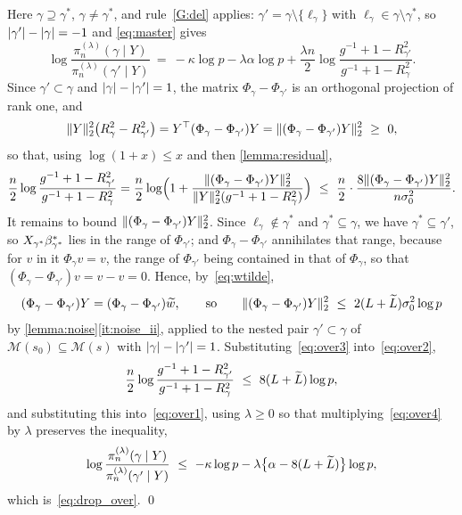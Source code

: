 Here $\gamma\supseteq\gamma^{\ast}$, $\gamma\neq\gamma^{\ast}$, and
rule~\ref{G:del} applies: $\gamma'=\gamma\setminus\{\ell_\gamma\}$ with
$\ell_\gamma\in\gamma\setminus\gamma^\ast$, so
$\lvert\gamma'\rvert-\lvert\gamma\rvert=-1$ and \eqref{eq:master} gives
\begin{equation}
    \label{eq:over1}
    \log\frac{\pi_n^{(\lambda)}(\gamma\mid Y)}
    {\pi_n^{(\lambda)}(\gamma'\mid Y)}
    \ =\ -\kappa\log p-\lambda\alpha\log p
    +\frac{\lambda n}{2}
    \log\frac{g^{-1}+1-R^{2}_{\gamma'}}{g^{-1}+1-R^{2}_{\gamma}} .
\end{equation}
Since $\gamma'\subset\gamma$ and $\lvert\gamma\rvert-\lvert\gamma'\rvert=1$, the matrix
$\Phi_\gamma-\Phi_{\gamma'}$ is an orthogonal projection of rank one, and
\begin{equation}
    \label{eq:over1b}
    \lVert Y\rVert_2^{2}\bigl(R^{2}_{\gamma}-R^{2}_{\gamma'}\bigr)
    =Y^{\top}(\Phi_\gamma-\Phi_{\gamma'})Y
    =\lVert(\Phi_\gamma-\Phi_{\gamma'})Y\rVert_2^{2}\ \geq\ 0 ,
\end{equation}
so that, using $\log(1+x)\leq x$ and then \cref{lemma:residual},
\begin{equation}
    \label{eq:over2}
    \frac n2\log\frac{g^{-1}+1-R^{2}_{\gamma'}}
    {g^{-1}+1-R^{2}_{\gamma}}
    =\frac n2\log\Bigl(1+\frac{\lVert(\Phi_\gamma-\Phi_{\gamma'})
        Y\rVert_2^{2}}{\lVert Y\rVert_2^{2}(g^{-1}+1-R^{2}_{\gamma})}\Bigr)
    \ \leq\ \frac n2\cdot
    \frac{8\lVert(\Phi_\gamma-\Phi_{\gamma'})Y\rVert_2^{2}}{n\sigma_0^{2}} .
\end{equation}
It remains to bound $\lVert(\Phi_\gamma-\Phi_{\gamma'})Y\rVert_2^{2}$. Since
$\ell_\gamma\notin\gamma^\ast$ and $\gamma^{\ast}\subseteq\gamma$, we have
$\gamma^{\ast}\subseteq\gamma'$, so $X_{\gamma^{\ast}}\beta^{\ast}_{\gamma^{\ast}}$ lies in the range of
$\Phi_{\gamma'}$; and $\Phi_\gamma-\Phi_{\gamma'}$ annihilates that range,
because for $v$ in it $\Phi_\gamma v=v$, the range of $\Phi_{\gamma'}$
being contained in that of $\Phi_\gamma$, so that
$(\Phi_\gamma-\Phi_{\gamma'})v=v-v=0$. Hence, by~\eqref{eq:wtilde},
\begin{equation}
    \label{eq:over3}
    (\Phi_\gamma-\Phi_{\gamma'})Y
    =(\Phi_\gamma-\Phi_{\gamma'})\widetilde w,
    \qquad\text{so}\qquad
    \lVert(\Phi_\gamma-\Phi_{\gamma'})Y\rVert_2^{2}
    \ \leq\ 2(L+\widetilde{L})\sigma_0^{2}\log p
\end{equation}
by \cref{lemma:noise}\ref{it:noise_ii}, applied to the nested pair
$\gamma'\subset\gamma$ of
$\mathscr{M}(s_0)\subseteq\mathscr{M}(s)$ with
$\lvert\gamma\rvert-\lvert\gamma'\rvert=1$. Substituting~\eqref{eq:over3}
into~\eqref{eq:over2},
\begin{equation}
    \label{eq:over4}
    \frac n2\log\frac{g^{-1}+1-R^{2}_{\gamma'}}
    {g^{-1}+1-R^{2}_{\gamma}}\ \leq\ 8(L+\widetilde{L})\log p ,
\end{equation}
and substituting this into~\eqref{eq:over1}, using $\lambda\geq0$ so that
multiplying~\eqref{eq:over4} by $\lambda$ preserves the inequality,
\begin{equation*}
    \log\frac{\pi_n^{(\lambda)}(\gamma\mid Y)}
    {\pi_n^{(\lambda)}(\gamma'\mid Y)}
    \ \leq\ -\kappa\log p
    -\lambda\bigl\{\alpha-8(L+\widetilde{L})\bigr\}\log p ,
\end{equation*}
which is~\eqref{eq:drop_over}. \qed

